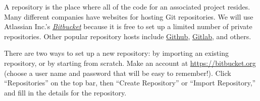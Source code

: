 A repository is the place where all of the code for an associated project resides.
Many different companies have websites for hosting Git repositories.
We will use Atlassian Inc.'s \href{https://bitbucket.org/}{\emph{Bitbucket}} because it is free to set up a limited number of private repositories.
Other popular repository hosts include \href{https://github.com/}{Github}, \href{https://gitlab.com/}{Gitlab}, and others.

There are two ways to set up a new repository: by importing an existing repository, or by starting from scratch.
Make an account at \url{https://bitbucket.org} (choose a user name and password that will be easy to remember!).
Click ``Repositories'' on the top bar, then ``Create Repository'' or ``Import Repository,'' and fill in the details for the repository.

\begin{comment} %
\begin{enumerate}
\item Make an account at \url{https://bitbucket.org}.
Choose a user name and password that will be easy to remember!
\item Click ``not now'' if it asks to set up your first repository.
\item To import an existing repository:
\begin{enumerate}
    \item Click ``Repositories,'' then ``Import Repository.''
    \item Give it the URL for the existing repository.%
    \item Fill in the description for the repository.
    \item Name the repository. %
    Once your repository is created, renaming it may cause connectivity issues, so choose wisely!
    \item Press ``Import repository.''
\end{enumerate}
\item To create an empty repository from scratch:
\begin{enumerate}
    \item Click ``Repositories,'' then ``Create Repository.''
    \item Fill in the name of the repository

\end{enumerate}
\end{enumerate}
\end{comment}


